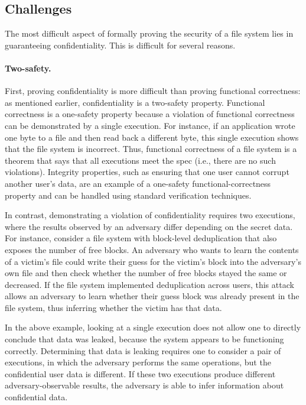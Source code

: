 \subsection{Challenges}
\label{s:goal:chal}

The most difficult aspect of formally proving the security of a file system lies
in guaranteeing confidentiality.  This is difficult for several reasons.

\paragraph{Two-safety.}
First, proving confidentiality is more difficult than
proving functional correctness: as mentioned earlier, confidentiality
is a two-safety property.  Functional correctness is a one-safety
property because a violation of functional correctness can be demonstrated
by a single execution.  For instance, if an application wrote one byte to
a file and then read back a different byte, this single execution shows
that the file system is incorrect.  Thus, functional correctness
of a file system is a theorem that says that all executions meet the
spec (i.e., there are no such violations).  Integrity properties,
such as ensuring that one user cannot corrupt another user's data,
are an example of a one-safety functional-correctness property and can
be handled using standard verification techniques.

In contrast, demonstrating a violation of confidentiality requires
two executions, where the results observed by an adversary differ depending on
the secret data.
For instance, consider a file system with block-level deduplication that
also exposes the number of free blocks.  An adversary who wants to
learn the contents of a victim's file could write their guess for the
victim's block into the adversary's own file and then check whether
the number of free blocks stayed the same or decreased.  If the file
system implemented deduplication across users, this attack allows an
adversary to learn whether their guess block was already present in the
file system, thus inferring whether the victim has that data.

In the above example, looking at a single execution does not allow one
to directly conclude that data was leaked, because the system appears
to be functioning correctly.  Determining that data is leaking requires
one to consider a pair of executions, in which the adversary performs
the same operations, but the confidential user data is different.
If these two executions produce different adversary-observable results,
the adversary is able to infer information about confidential data.

